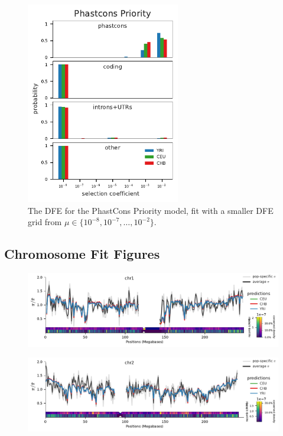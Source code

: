 \documentclass[11pt]{article}
\begin{document}
\begin{figure}[htbp]
    \label{suppfig:dfe-pop-smallgrid}
  \centering
  \includegraphics[width=0.6\textwidth]{figures/supplementary/phastcons_priority_pop_dfe_smallselgrid.pdf}
  \caption{The DFE for the PhastCons Priority model, fit with a smaller DFE grid from 
  $\mu \in \{10^{-8}, 10^{-7}, \ldots, 10^{-2}\}$.}
\end{figure}

\clearpage

\subsection{Chromosome Fit Figures}

\begin{figure}[!htb]
  \centering
  \includegraphics[width=\textwidth]{figures/supplementary/pred_plot_chr1.pdf}
  \label{suppfig:fit-chr1}
\end{figure}

\begin{figure}[!htb]
  \centering
  \includegraphics[width=\textwidth]{figures/supplementary/pred_plot_chr2.pdf}
  \label{suppfig:fit-chr2}
\end{figure}
\end{document}
